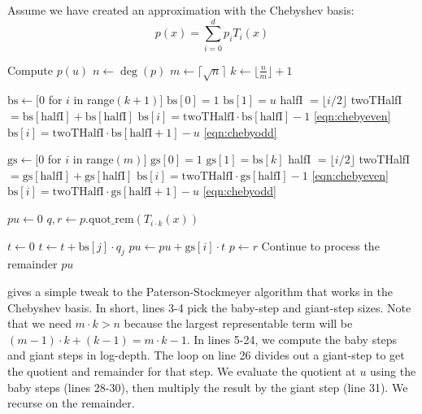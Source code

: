 \documentclass[../fheimpl.tex]{subfiles}
\begin{document}
	Assume we have created an approximation with the Chebyshev basis:
	\[p(x)=\sum_{i=0}^d p_iT_i(x)\]
	
	\begin{algorithm}
		\caption{Simple Paterson-Stockmeyer in Chebyshev Basis}\label{alg:chebyps}
		\begin{algorithmic}[1]
			\Comment Compute $p(u)$
			\State $n \gets \deg(p)$
			\State $m \gets \lceil\sqrt{n}\rceil$
			\State $k \gets \lfloor \frac{n}{m}\rfloor + 1$
			
			\State $\mathrm{bs} \gets [0$ for $i$ in range$(k+1)]$
			\State $\mathrm{bs}[0] = 1$
			\State $\mathrm{bs}[1] = u$
			\State halfI $=\lfloor i / 2\rfloor$
			\State twoTHalfI $= \mathrm{bs}[\mathrm{halfI}] + \mathrm{bs}[\mathrm{halfI}]$
			\State $\mathrm{bs}[i] = \mathrm{twoTHalfI}\cdot \mathrm{bs}[\mathrm{halfI}] - 1$
			\Comment \cref{eqn:chebyeven}
			\Else
			\State $\mathrm{bs}[i] = \mathrm{twoTHalfI}\cdot \mathrm{bs}[\mathrm{halfI}+1] - u$
			\Comment \cref{eqn:chebyodd}
			\EndIf
			\EndFor
			
			\State $\mathrm{gs} \gets [0$ for $i$ in range$(m)]$
			\State $\mathrm{gs}[0] = 1$
			\State $\mathrm{gs}[1] = \textrm{bs}[k]$
			\State halfI $=\lfloor i / 2\rfloor$
			\State twoTHalfI $= \mathrm{gs}[\mathrm{halfI}] + \mathrm{gs}[\mathrm{halfI}]$
			\State $\mathrm{bs}[i] = \mathrm{twoTHalfI}\cdot \mathrm{gs}[\mathrm{halfI}] - 1$
			\Comment \cref{eqn:chebyeven}
			\Else
			\State $\mathrm{bs}[i] = \mathrm{twoTHalfI}\cdot \mathrm{gs}[\mathrm{halfI}+1] - u$
			\Comment \cref{eqn:chebyodd}
			\EndIf
			\EndFor
			
			\State $pu \gets 0$
			\State $q, r \gets p.\text{quot\_rem}(T_{i\cdot k}(x))$
			
			
			\State $t \gets 0$
			\State $t \gets t + \mathrm{bs}[j]\cdot q_j$
			\EndFor
			\State $pu \gets pu + \mathrm{gs}[i]\cdot t$
			\State $p \gets r$
			\Comment Continue to process the remainder
			\EndFor
			\State \Return $pu$
			\EndProcedure
		\end{algorithmic}
	\end{algorithm}
	
	 gives a simple tweak to the Paterson-Stockmeyer algorithm that works in the Chebyshev basis. In short, lines 3-4 pick the baby-step and giant-step sizes. Note that we need $m\cdot k > n$ because the largest representable term will be $(m-1)\cdot k + (k-1) = m\cdot k - 1$. In lines 5-24, we compute the baby steps and giant steps in log-depth. The loop on line 26 divides out a giant-step to get the quotient and remainder for that step. We evaluate the quotient at $u$ using the baby steps (lines 28-30), then multiply the result by the giant step (line 31). We recurse on the remainder.
	
\end{document}
